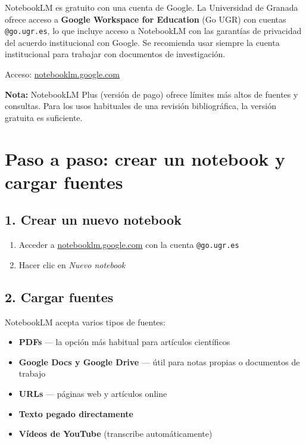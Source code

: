 \documentclass[
]{book}
\providecommand{\tightlist}{%
  \setlength{\itemsep}{0pt}\setlength{\parskip}{0pt}}
\begin{document}
NotebookLM es gratuito con una cuenta de Google. La Universidad de Granada ofrece acceso a \textbf{Google Workspace for Education} (Go UGR) con cuentas \texttt{@go.ugr.es}, lo que incluye acceso a NotebookLM con las garantías de privacidad del acuerdo institucional con Google. Se recomienda usar siempre la cuenta institucional para trabajar con documentos de investigación.

Acceso: \href{https://notebooklm.google.com}{notebooklm.google.com}

\textbf{Nota:} NotebookLM Plus (versión de pago) ofrece límites más altos de fuentes y consultas. Para los usos habituales de una revisión bibliográfica, la versión gratuita es suficiente.

\section{Paso a paso: crear un notebook y cargar fuentes}\label{paso-a-paso-crear-un-notebook-y-cargar-fuentes}

\subsection{1. Crear un nuevo notebook}\label{crear-un-nuevo-notebook}

\begin{enumerate}
\def\labelenumi{\arabic{enumi}.}
\tightlist
\item
  Acceder a \href{https://notebooklm.google.com}{notebooklm.google.com} con la cuenta \texttt{@go.ugr.es}
\item
  Hacer clic en \emph{Nuevo notebook}
\end{enumerate}

\subsection{2. Cargar fuentes}\label{cargar-fuentes}

NotebookLM acepta varios tipos de fuentes:

\begin{itemize}
\tightlist
\item
  \textbf{PDFs} --- la opción más habitual para artículos científicos
\item
  \textbf{Google Docs y Google Drive} --- útil para notas propias o documentos de trabajo
\item
  \textbf{URLs} --- páginas web y artículos online
\item
  \textbf{Texto pegado directamente}
\item
  \textbf{Vídeos de YouTube} (transcribe automáticamente)
\end{itemize}
\end{document}
